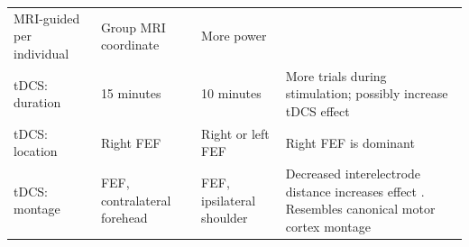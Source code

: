 \documentclass[11pt,english,]{memoir}
\begin{document}
\begin{longtable}[]{@{}llll@{}}
\begin{minipage}[t]{0.21\columnwidth}
MRI-guided per individual\strut
\end{minipage} & \begin{minipage}[t]{0.16\columnwidth}\raggedright
Group MRI coordinate\strut
\end{minipage} & \begin{minipage}[t]{0.38\columnwidth}\raggedright
More power \autocite{Sack2009}\strut
\end{minipage}\tabularnewline
\begin{minipage}[t]{0.14\columnwidth}\raggedright
tDCS: duration\strut
\end{minipage} & \begin{minipage}[t]{0.21\columnwidth}\raggedright
15 minutes\strut
\end{minipage} & \begin{minipage}[t]{0.16\columnwidth}\raggedright
10 minutes\strut
\end{minipage} & \begin{minipage}[t]{0.38\columnwidth}\raggedright
More trials during stimulation; possibly increase tDCS effect\strut
\end{minipage}\tabularnewline
\begin{minipage}[t]{0.14\columnwidth}\raggedright
tDCS: location\strut
\end{minipage} & \begin{minipage}[t]{0.21\columnwidth}\raggedright
Right FEF\strut
\end{minipage} & \begin{minipage}[t]{0.16\columnwidth}\raggedright
Right or left FEF\strut
\end{minipage} & \begin{minipage}[t]{0.38\columnwidth}\raggedright
Right FEF is dominant \autocite{Duecker2015}\strut
\end{minipage}\tabularnewline
\begin{minipage}[t]{0.14\columnwidth}\raggedright
tDCS: montage\strut
\end{minipage} & \begin{minipage}[t]{0.21\columnwidth}\raggedright
FEF, contralateral forehead\strut
\end{minipage} & \begin{minipage}[t]{0.16\columnwidth}\raggedright
FEF, ipsilateral shoulder\strut
\end{minipage} & \begin{minipage}[t]{0.38\columnwidth}\raggedright
Decreased interelectrode distance increases effect \autocites{Moliadze2010}{Opitz2015}. Resembles canonical motor cortex montage\strut

\end{minipage}
\end{longtable}
\end{document}
